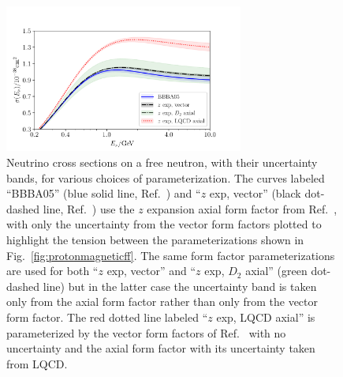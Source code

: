 \begin{figure}[hbt!]
 \centering
 \includegraphics[width=0.7\textwidth]{plots/xsec_comparison-standalone.pdf}\vspace{4pt}
\caption{
 Neutrino cross sections on a free neutron, with their uncertainty bands,
 for various choices of parameterization.
 The curves labeled ``BBBA05'' (blue solid line, Ref.~\cite{Bradford:2006yz})
 and ``$z$ exp, vector'' (black dot-dashed line, Ref.~\cite{Borah:2020gte}) use the
 $z$ expansion axial form factor from Ref.~\cite{Meyer:2016oeg},
 with only the uncertainty from the vector form factors plotted
 to highlight the tension between the parameterizations shown in Fig.~\ref{fig:protonmagneticff}.
 The same form factor parameterizations are used for both ``$z$ exp, vector'' and
 ``$z$ exp, $D_{2}$ axial'' (green dot-dashed line)
 but in the latter case the uncertainty band is taken only from
 the axial form factor rather than only from the vector form factor.
 The red dotted line labeled ``$z$ exp, LQCD axial'' is parameterized by
 the vector form factors of Ref.~\cite{Borah:2020gte} with no uncertainty
 and the axial form factor with its uncertainty taken from LQCD.
 \label{fig:nucleonxsec}
}
\end{figure}

%
%
%
